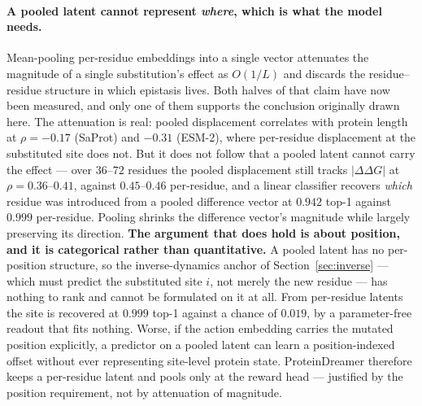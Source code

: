 \documentclass[12pt, a4paper]{article}
\begin{document}
\paragraph{A pooled latent cannot represent \textit{where}, which is what the model needs.} Mean-pooling per-residue embeddings into a single vector attenuates the magnitude of a single substitution's effect as $O(1/L)$ and discards the residue--residue structure in which epistasis lives. Both halves of that claim have now been measured, and only one of them supports the conclusion originally drawn here. The attenuation is real: pooled displacement correlates with protein length at $\rho = -0.17$ (SaProt) and $-0.31$ (ESM-2), where per-residue displacement at the substituted site does not. But it does not follow that a pooled latent cannot carry the effect --- over $36$--$72$ residues the pooled displacement still tracks $\lvert\Delta\Delta G\rvert$ at $\rho = 0.36$--$0.41$, against $0.45$--$0.46$ per-residue, and a linear classifier recovers \textit{which} residue was introduced from a pooled difference vector at $0.942$ top-1 against $0.999$ per-residue. Pooling shrinks the difference vector's magnitude while largely preserving its direction. \textbf{The argument that does hold is about position, and it is categorical rather than quantitative.} A pooled latent has no per-position structure, so the inverse-dynamics anchor of Section~\ref{sec:inverse} --- which must predict the substituted site $i$, not merely the new residue --- has nothing to rank and cannot be formulated on it at all. From per-residue latents the site is recovered at $0.999$ top-1 against a chance of $0.019$, by a parameter-free readout that fits nothing. Worse, if the action embedding carries the mutated position explicitly, a predictor on a pooled latent can learn a position-indexed offset without ever representing site-level protein state. ProteinDreamer therefore keeps a per-residue latent and pools only at the reward head --- justified by the position requirement, not by attenuation of magnitude.
\end{document}
